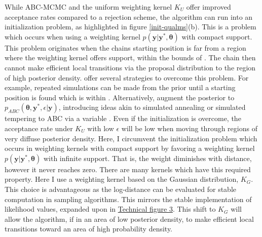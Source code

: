 While ABC-MCMC and the uniform weighting kernel $K_U$ offer improved acceptance rates compared to a rejection scheme, the algorithm can run into an initialization problem, as highlighted in figure \ref{init-qualms}(b). This is a problem which occurs when using a weighting kernel $p(\bm{y}|\bm{y^*},\bm{\theta})$ with compact support. This problem originates when the chains starting position is far from a region where the weighting kernel offers support, within the bounds of \pm\epsilon. The chain then cannot make efficient local transitions via the proposal distribution to the region of high posterior density. \citet{Sisson2010a} offer several strategies to overcome this problem. For example, repeated simulations can be made from the prior until a starting position is found which is within \pm \epsilon. Alternatively, \citet{Bortot2007} augment the posterior to $p_{ABC}(\bm{\theta},\bm{y^*},\epsilon|\bm{y})$, introducing ideas akin to simulated annealing or simulated tempering to ABC via a variable \epsilon. Even if the initialization is overcome, the acceptance rate under $K_U$ with low $\epsilon$ will be low when moving through regions of very diffuse posterior density.
Here, I circumvent the initialization problem which occurs in weighting kernels with compact support by favoring a weighting kernel $p(\bm{y}|\bm{y^*},\bm{\theta})$ with infinite support. That is, the weight diminishes with distance, however it never reaches zero. There are many kernels which have this required property. Here I use a weighting kernel based on the Gaussian distribution, $K_G$. This choice is advantageous as the log-distance can be evaluated for stable computation in sampling algorithms. This mirrors the stable implementation of likelihood values, expanded upon in \hyperref[tf3]{Technical figure 3}. This shift to $K_G$ will allow the algorithm, if in an area of low posterior density, to make efficient local transitions toward an area of high probability density.\par

